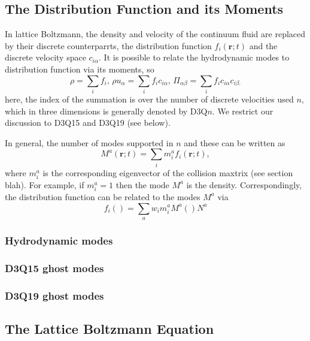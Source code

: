 \subsection{The Distribution Function and its Moments}

In lattice Boltzmann, the density and velocity of the continuum fluid
are replaced by their discrete counterparrts, the distribution function
$f_i(\mathbf{r}; t)$ and the discrete velocity space $c_{i\alpha}$.
It is possible to relate the hydrodynamic modes to distribution
function via its moments, so
\begin{equation}
\rho = \sum_i f_i,  \,
\rho u_\alpha = \sum_i f_i c_{i\alpha},  \,
\Pi_{\alpha\beta} = \sum_i f_i c_{i\alpha} c_{i\beta.}
\end{equation}
here, the index of the summation is over the number of discrete
velocities used $n$, which in three dimensions is generally
denoted by D3Q$n$. We restrict our discussion to D3Q15 and
D3Q19 (see below).

In general, the number of modes supported in $n$ and these can
be written as
\begin{equation}
M^a(\mathbf{r};t) = \sum_i m_i^a f_i(\mathbf{r};t),
\end{equation}
where $m_i^a$ is the corresponding eigenvector of the collision
maxtrix (see section blah). For example, if $m_i^a = 1$ then the
mode $M^a$ is the density. Correspondingly, the distribution
function can be related to the modes $M^a$ via
\begin{equation}
f_i() = \sum_a w_i m_i^a M^a() N^a
\end{equation}

\subsubsection{Hydrodynamic modes}

\subsubsection{D3Q15 ghost modes}

\subsubsection{D3Q19 ghost modes}

\subsection{The Lattice Boltzmann Equation}

